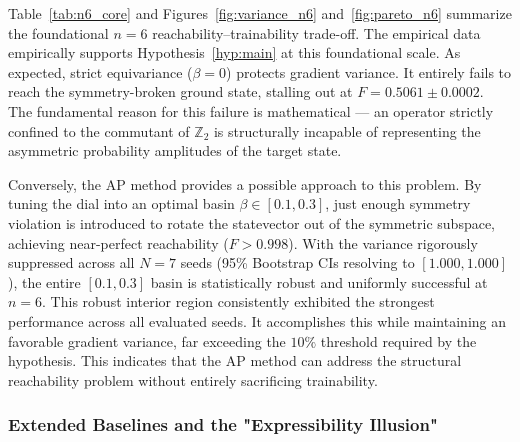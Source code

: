\documentclass[pdflatex,sn-mathphys-num]{sn-jnl}
\theoremstyle{thmstyleone}
\theoremstyle{thmstyletwo}
\theoremstyle{thmstylethree}
\begin{document}
Table~\ref{tab:n6_core} and Figures~\ref{fig:variance_n6} and~\ref{fig:pareto_n6} summarize the foundational $n=6$ reachability--trainability trade-off. The empirical data empirically supports Hypothesis~\ref{hyp:main} at this foundational scale. 
As expected, strict equivariance ($\beta=0$) protects gradient variance. It entirely fails to reach the symmetry-broken ground state, stalling out at $F=0.5061 \pm 0.0002$. The fundamental reason for this failure is mathematical --- an operator strictly confined to the commutant of $\mathbb{Z}_2$ is structurally incapable of representing the asymmetric probability amplitudes of the target state.

Conversely, the AP method provides a possible approach to this problem. By tuning the dial into an optimal basin $\beta \in [0.1, 0.3]$, just enough symmetry violation is introduced to rotate the statevector out of the symmetric subspace, achieving near-perfect reachability ($F > 0.998$). With the variance rigorously suppressed across all $N=7$ seeds (95\% Bootstrap CIs resolving to $[1.000, 1.000]$), the entire $[0.1, 0.3]$ basin is statistically robust and uniformly successful at $n=6$. This robust interior region consistently exhibited the strongest performance across all evaluated seeds. It accomplishes this while maintaining an favorable gradient variance, far exceeding the $10\%$ threshold required by the hypothesis. This indicates that the AP method can address the structural reachability problem without entirely sacrificing trainability.

\subsubsection{Extended Baselines and the "Expressibility Illusion"}
\end{document}
